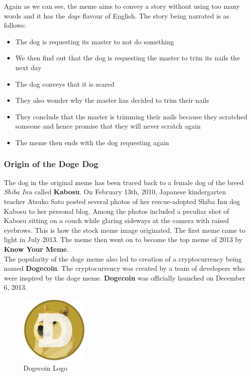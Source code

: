 \documentclass{article}
\begin{document}
Again as we can see, the meme aims to convey a story without using too many words and it has the \textit{doge} flavour of English. The story being narrated is as follows:
\begin{itemize}
    \item The dog is requesting its master to not do something
    \item We then find out that the dog is requesting the master to trim its nails the next day
    \item The dog conveys that it is scared
    \item They also wonder why the master has decided to trim their nails
    \item They conclude that the master is trimming their nails because they scratched someone and hence promise that they will never scratch again
    \item The meme then ends with the dog requesting again
\end{itemize}


\subsubsection{Origin of the Doge Dog}
The dog in the original meme has been traced back to a female dog of the breed \textit{Shiba Inu} called \textbf{Kabosu}. On February 13th, 2010, Japanese kindergarten teacher Atsuko Sato posted several photos of her rescue-adopted Shiba Inu dog Kabosu to her personal blog. Among the photos included a peculiar shot of Kabosu sitting on a couch while glaring sideways at the camera with raised eyebrows. This is how the stock meme image originated. The first meme came to light in July 2013. The meme then went on to become the top meme of 2013 by \textbf{Know Your Meme}.\\
The popularity of the doge meme also led to creation of a cryptocurrency being named \textbf{Dogecoin}. The cryptocurrency was created by a team of developers who were inspired by the doge meme. \textbf{Dogecoin} was officially launched on December 6, 2013.
\begin{figure}[H]
    \centering
    \includegraphics[width=0.3\textwidth]{figures/Dogecoin_logo.png}
    \caption{Dogecoin Logo}
\end{figure}
\end{document}
